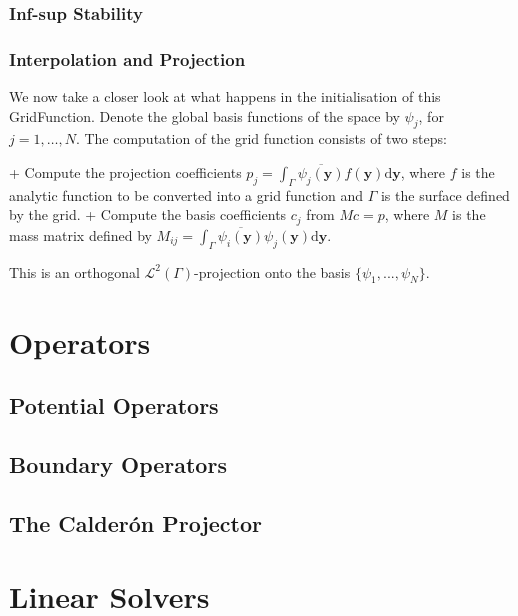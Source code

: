 \documentclass[a4paper]{book}
\begin{document}
\subsection{Inf-sup Stability}



\subsection{Interpolation and Projection}


We now take a closer look at what happens in the initialisation of this GridFunction.
Denote the global basis functions of the space by $\psi_j$, for $j=1,\dots,N$.
The computation of the grid function consists of two steps:

+ Compute the projection coefficients
  $p_j=\int_{\Gamma}\overline{\psi_j(\mathbf{y})}f(\mathbf{y})\mathrm{d}\mathbf{y}$,
  where $f$ is the analytic function to be converted into a grid function and $\Gamma$
  is the surface defined by the grid.
+ Compute the basis coefficients $c_j$ from $Mc=p$, where $M$ is the mass matrix defined by
  $M_{ij}=\int_{\Gamma}\overline{\psi_i(\mathbf{y})}\psi_j(\mathbf{y})\mathrm{d}\mathbf{y}$.

This is an orthogonal $\mathcal{L}^2(\Gamma)$-projection onto the basis $\{\psi_1,...,\psi_N\}$.


\chapter{Operators}



\section{Potential Operators}



\section{Boundary Operators}



\section{The Calder\'on Projector}



\chapter{Linear Solvers}
\end{document}
